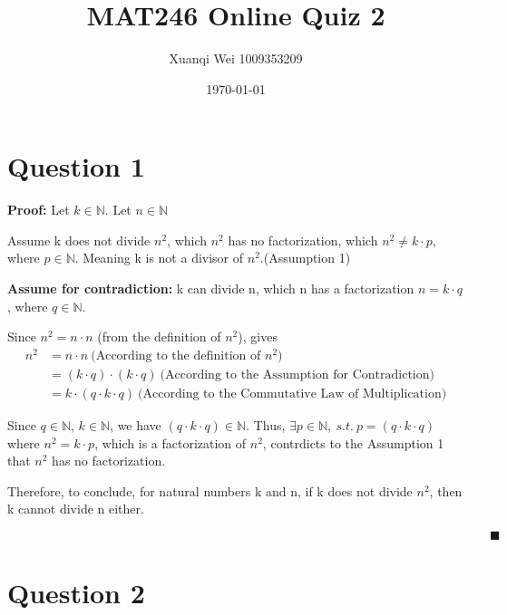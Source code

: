 \documentclass[12pt]{article}
\title{MAT246 Online Quiz 2}
\author{Xuanqi Wei 1009353209}
\date{\today}
\begin{document}
\maketitle
\thispagestyle{empty}

\newpage

\setcounter{page}{1}

\section{Question 1}

\textbf{Proof:} Let $k \in \mathbb{N}$. Let $n \in \mathbb{N}$

\noindent Assume k does not divide $n^2$, which $n^2$ has no factorization, which $n^2 \neq k \cdot p$, where $p \in \mathbb{N}$.
Meaning k is not a divisor of $n^2$.(Assumption 1)

\noindent \textbf{Assume for contradiction:} k can divide n, which n has a factorization $n = k \cdot q$, where $q \in \mathbb{N}$.

\noindent Since $n^2 = n \cdot n$ (from the definition of $n^2$), gives
\begin{align*}
    n^2 &= n \cdot n\ \text{(According to the definition of $n^2$)} \\
    &= (k \cdot q) \cdot (k \cdot q) \ \text{(According to the Assumption for Contradiction)} \\
    &= k \cdot (q \cdot k \cdot q) \ \text{(According to the Commutative Law of Multiplication)}
\end{align*}

\noindent Since $q \in \mathbb{N}$, $k \in \mathbb{N}$, we have $(q \cdot k \cdot q) \in \mathbb{N}$.
Thus, $\exists p \in \mathbb{N},\ s.t.\ p=(q \cdot k \cdot q)$ where $n^2 = k \cdot p $, which is a factorization of $n^2$, contrdicts to the Assumption 1 that $n^2$ has no factorization.

\noindent Therefore, to conclude, for natural numbers k and n, if k does not divide $n^2$, then k cannot divide n either.

$\quad \quad \quad \quad \quad \quad \quad \quad \quad \quad \quad \quad \quad \quad \quad \quad \quad \quad \quad \quad \quad \quad \quad \quad \quad \quad \quad \quad \quad \quad \quad \quad \quad \quad \quad \quad \quad \quad  \blacksquare $

\section{Question 2}
\end{document}
